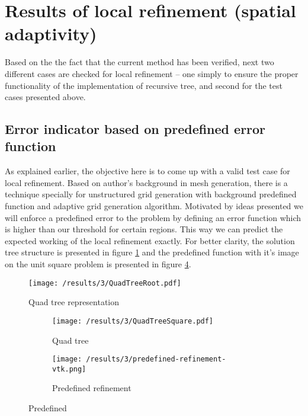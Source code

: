 \section{Results of local refinement (spatial adaptivity)}
Based on the the fact that the current method has been verified, next two different cases are checked for local refinement -- one simply to ensure the proper functionality of the implementation of recursive tree,  and second for the test cases presented above. 

\subsection{Error indicator based on predefined error function}
As explained earlier, the objective here is to come up with a valid test case for local refinement. Based on author's background in mesh generation, there is a technique specially for unstructured grid generation with background predefined function \cite{Henshaw1996} and adaptive grid generation algorithm\cite{Ebeida2010}. Motivated by ideas presented we will enforce a predefined error to the problem by defining an error function which is higher than our threshold for certain regions. This way we can predict the expected working of the local refinement exactly. For better clarity, the solution tree structure is presented in figure \ref{fig:QuadTreeRoot} and the predefined function with it's image on the unit square problem is presented in figure \ref{fig:Predef}.\\


\begin{figure}[h]
	\centering
	    \texttt{[image: /results/3/QuadTreeRoot.pdf]}
		\centering
        \caption{Quad tree representation}
        \label{fig:QuadTreeRoot}
\end{figure}


		
\begin{figure}[h]
	\centering
    \begin{subfigure}[b]{0.66\textwidth}    
	    \texttt{[image: /results/3/QuadTreeSquare.pdf]}
		\centering    
		\caption{Quad tree}
		\label{fig:QuadTreeSquare}
    \end{subfigure} 
    \begin{subfigure}[b]{0.75\textwidth}
	    \texttt{[image: /results/3/predefined-refinement-vtk.png]}
		\centering
        \caption{Predefined refinement}
        \label{fig:PredefRefine}
    \end{subfigure} 
    \caption{Predefined}
    \label{fig:Predef}
\end{figure}

